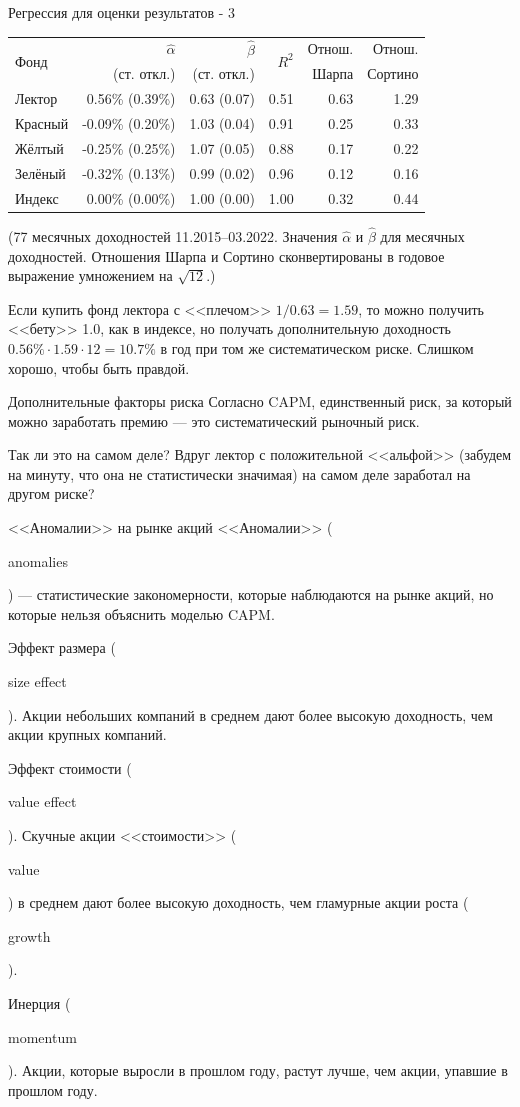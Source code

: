 \documentclass{beamer}
\newcommand{\en}[1]{\begin{otherlanguage}{english}#1\end{otherlanguage}}
\begin{document}
\begin{frame}{Регрессия для оценки результатов - 3}
\center
\begin{tabular}{l|r|r|r|r|r}
\multirow{2}{*}{Фонд}    & $\hat{\alpha}$ & $\hat{\beta}$ & \multirow{2}{*}{$R^2$} & Отнош. & Отнош. \\
& \scriptsize{(ст. откл.)} & \scriptsize{(ст. откл.)} & & Шарпа & Сортино \\ \hline
Лектор  &  0.56\% \scriptsize{(0.39\%)} & 0.63 \scriptsize{(0.07)}   &  0.51 & 0.63 & 1.29 \\
Красный & -0.09\% \scriptsize{(0.20\%)} & 1.03 \scriptsize{(0.04)}   &  0.91 & 0.25 & 0.33 \\
Жёлтый  & -0.25\% \scriptsize{(0.25\%)} & 1.07 \scriptsize{(0.05)}   &  0.88 & 0.17 & 0.22 \\
Зелёный & -0.32\% \scriptsize{(0.13\%)} & 0.99 \scriptsize{(0.02)}   &  0.96 & 0.12 & 0.16 \\ \hline
Индекс  & 0.00\% \scriptsize{(0.00\%)}  & 1.00 \scriptsize{(0.00)}   &  1.00 & 0.32 & 0.44
\end{tabular}
\justify
{\scriptsize(77 месячных доходностей 11.2015--03.2022. Значения $\hat{\alpha}$ 
и $\hat{\beta}$ для месячных доходностей. Отношения Шарпа и Сортино 
сконвертированы в годовое выражение умножением на $\sqrt{12}$.)}

\justify
Если купить фонд лектора с <<плечом>> $1/0.63 = 1.59$, то можно получить 
<<бету>> 1.0, как в индексе, но получать дополнительную доходность $0.56\% 
\cdot 1.59 \cdot 12 = 10.7\%$ в год при том же систематическом риске. Слишком 
хорошо, чтобы быть правдой.
\end{frame}



\begin{frame}{Дополнительные факторы риска}
\justify
Согласно CAPM, единственный риск, за который можно заработать премию --- это 
систематический рыночный риск.

\justify
Так ли это на самом деле? Вдруг лектор с положительной <<альфой>> (забудем на 
минуту, что она не статистически значимая) на самом деле заработал на другом 
риске?

\end{frame}



\begin{frame}{<<Аномалии>> на рынке акций}
\justify
<<Аномалии>> (\en{anomalies}) --- статистические закономерности, которые 
наблюдаются на рынке акций, но которые нельзя объяснить моделью CAPM.

\justify
Эффект размера (\en{size effect}). Акции небольших компаний в среднем дают 
более высокую доходность, чем акции крупных компаний.

\justify
Эффект стоимости (\en{value effect}). Скучные акции <<стоимости>> (\en{value}) 
в среднем дают более высокую доходность, чем гламурные акции роста 
(\en{growth}).

\justify
Инерция (\en{momentum}). Акции, которые выросли в прошлом году, растут лучше, 
чем акции, упавшие в прошлом году.
\end{frame}
\end{document}
